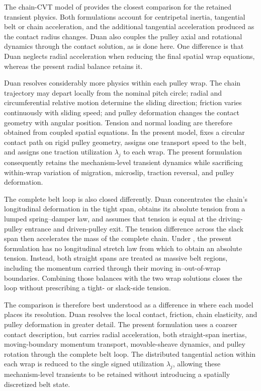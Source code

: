 \documentclass[11pt]{report}
\numberwithin{equation}{section}
\newcounter{assump}
\begin{document}
The chain-CVT model of \citet{DuanEtAl2016} provides the closest comparison
for the retained transient physics. Both formulations account for centripetal
inertia, tangential belt or chain acceleration, and the additional tangential
acceleration produced as the contact radius changes. Duan also couples the
pulley axial and rotational dynamics through the contact solution, as is done
here. One difference is that Duan neglects radial acceleration when reducing
the final spatial wrap equations, whereas the present radial balance retains
it.

Duan resolves considerably more physics within each pulley wrap. The chain
trajectory may depart locally from the nominal pitch circle; radial and
circumferential relative motion determine the sliding direction; friction
varies continuously with sliding speed; and pulley deformation changes the
contact geometry with angular position. Tension and normal loading are
therefore obtained from coupled spatial equations. In the present model,
 fixes a circular contact path on rigid
pulley geometry,  assigns one transport speed
to the belt, and  assigns one traction
utilization \(\lambda_j\) to each wrap. The present formulation consequently
retains the mechanism-level transient dynamics while sacrificing within-wrap
variation of migration, microslip, traction reversal, and pulley deformation.

The complete belt loop is also closed differently. Duan concentrates the
chain's longitudinal deformation in the tight span, obtains its absolute
tension from a lumped spring--damper law, and assumes that tension is equal at
the driving-pulley entrance and driven-pulley exit. The tension difference
across the slack span then accelerates the mass of the complete chain. Under
, the present formulation has no
longitudinal stretch law from which to obtain an absolute tension. Instead,
both straight spans are treated as massive belt regions, including the
momentum carried through their moving in--out-of-wrap boundaries. Combining
those balances with the two wrap solutions closes the loop without prescribing
a tight- or slack-side tension.

The comparison is therefore best understood as a difference in where each
model places its resolution. Duan resolves the local contact, friction, chain
elasticity, and pulley deformation in greater detail. The present formulation
uses a coarser contact description, but carries radial acceleration, both
straight-span inertias, moving-boundary momentum transport, movable-sheave
dynamics, and pulley rotation through the complete belt loop. The distributed
tangential action within each wrap is reduced to the single signed utilization
\(\lambda_j\), allowing these mechanism-level transients to be retained
without introducing a spatially discretized belt state.
\end{document}
